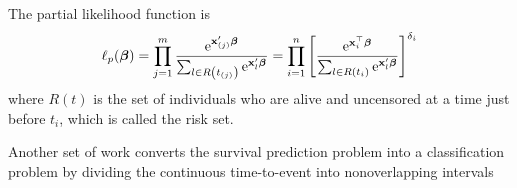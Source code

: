 The partial likelihood function is
\begin{equation}
	\ell_{p}(\boldsymbol{\beta})=\prod_{j=1}^{m}\frac{\mathrm{e}^{{\bf x}_{(j)}^{\prime}\boldsymbol{\beta}}}{\sum_{l\in R\left(t_{(j)}\right)}\mathrm{e}^{{\bf x}_{l}^{\prime}\boldsymbol{\beta}}}=\prod_{i=1}^{n}\left[\frac{\mathrm{e}^{{\bf x}_{i}^{\top}\boldsymbol{\beta}}}{\sum_{l\in R\left(t_{i}\right)}\mathrm{e}^{{\bf x}_{l}^{\prime}\boldsymbol{\beta}}}\right]^{\delta_{i}}
\end{equation}
where $R(t)$ is the set of individuals who are alive and uncensored at a time just before $t_{i}$, which is called the risk set.

Another set of work converts the survival prediction problem into a classification problem by dividing the continuous time-to-event into nonoverlapping intervals